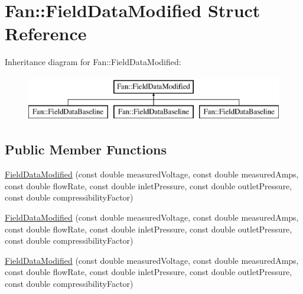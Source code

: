 \hypertarget{struct_fan_1_1_field_data_modified}{}\section{Fan\+:\+:Field\+Data\+Modified Struct Reference}
\label{struct_fan_1_1_field_data_modified}
Inheritance diagram for Fan\+:\+:Field\+Data\+Modified\+:\begin{figure}[H]
\begin{center}
\leavevmode
\includegraphics[height=2.000000cm]{d0/db0/struct_fan_1_1_field_data_modified}
\end{center}
\end{figure}
\subsection*{Public Member Functions}
\begin{DoxyCompactItemize}
\item 
\hyperlink{struct_fan_1_1_field_data_modified_adef6a41f34fefd1acf3253d30fb4048d}{Field\+Data\+Modified} (const double measured\+Voltage, const double measured\+Amps, const double flow\+Rate, const double inlet\+Pressure, const double outlet\+Pressure, const double compressibility\+Factor)
\item 
\hyperlink{struct_fan_1_1_field_data_modified_adef6a41f34fefd1acf3253d30fb4048d}{Field\+Data\+Modified} (const double measured\+Voltage, const double measured\+Amps, const double flow\+Rate, const double inlet\+Pressure, const double outlet\+Pressure, const double compressibility\+Factor)
\item 
\hyperlink{struct_fan_1_1_field_data_modified_adef6a41f34fefd1acf3253d30fb4048d}{Field\+Data\+Modified} (const double measured\+Voltage, const double measured\+Amps, const double flow\+Rate, const double inlet\+Pressure, const double outlet\+Pressure, const double compressibility\+Factor)
\end{DoxyCompactItemize}
